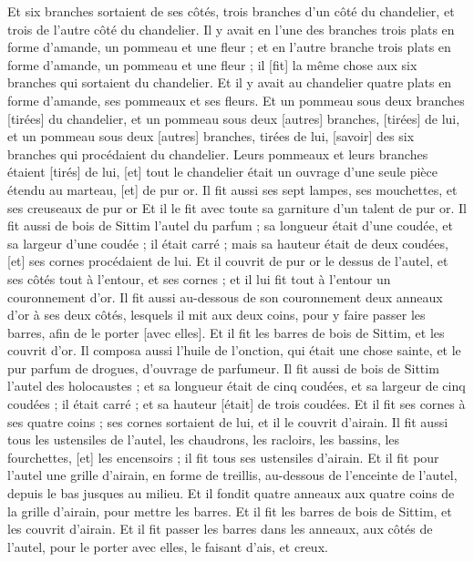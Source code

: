 \begin{multicols}{2}
Et six branches sortaient de ses côtés, trois branches d'un côté du chandelier, et trois de l'autre côté du chandelier.
Il y avait en l'une des branches trois plats en forme d'amande, un pommeau et une fleur ; et en l'autre branche trois plats en forme d'amande, un pommeau et une fleur ; il [fit] la même chose aux six branches qui sortaient du chandelier.
Et il y avait au chandelier quatre plats en forme d'amande, ses pommeaux et ses fleurs.
Et un pommeau sous deux branches [tirées] du chandelier, et un pommeau sous deux [autres] branches, [tirées] de lui, et un pommeau sous deux [autres] branches, tirées de lui, [savoir] des six branches qui procédaient du chandelier.
Leurs pommeaux et leurs branches étaient [tirés] de lui, [et] tout le chandelier était un ouvrage d'une seule pièce étendu au marteau, [et] de pur or.
Il fit aussi ses sept lampes, ses mouchettes, et ses creuseaux de pur or
Et il le fit avec toute sa garniture d'un talent de pur or.
Il fit aussi de bois de Sittim l'autel du parfum ; sa longueur était d'une coudée, et sa largeur d'une coudée ; il était carré ; mais sa hauteur était de deux coudées, [et] ses cornes procédaient de lui.
Et il couvrit de pur or le dessus de l'autel, et ses côtés tout à l’entour, et ses cornes ; et il lui fit tout à l’entour un couronnement d'or.
Il fit aussi au-dessous de son couronnement deux anneaux d'or à ses deux côtés, lesquels il mit aux deux coins, pour y faire passer les barres, afin de le porter [avec elles].
Et il fit les barres de bois de Sittim, et les couvrit d'or.
Il composa aussi l'huile de l'onction, qui était une chose sainte, et le pur parfum de drogues, d'ouvrage de parfumeur.
\VerseOne{}Il fit aussi de bois de Sittim l'autel des holocaustes ; et sa longueur était de cinq coudées, et sa largeur de cinq coudées ; il était carré ; et sa hauteur [était] de trois coudées.
Et il fit ses cornes à ses quatre coins ; ses cornes sortaient de lui, et il le couvrit d'airain.
Il fit aussi tous les ustensiles de l'autel, les chaudrons, les racloirs, les bassins, les fourchettes, [et] les encensoirs ; il fit tous ses ustensiles d'airain.
Et il fit pour l'autel une grille d'airain, en forme de treillis, au-dessous de l'enceinte de l'autel, depuis le bas jusques au milieu.
Et il fondit quatre anneaux aux quatre coins de la grille d'airain, pour mettre les barres.
Et il fit les barres de bois de Sittim, et les couvrit d'airain.
Et il fit passer les barres dans les anneaux, aux côtés de l'autel, pour le porter avec elles, le faisant d'ais, et creux.

\end{multicols}
